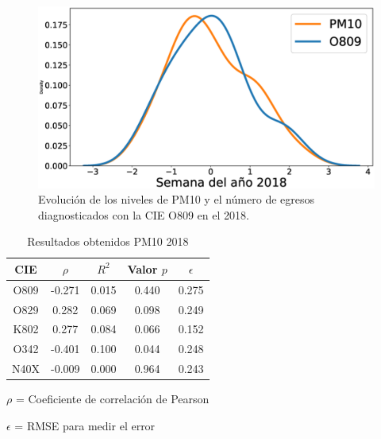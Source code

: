 \begin{figure}[h!]
\setcounter{figure}{2} %
\captionsetup{type=figure} %
\begin{center}
   \includegraphics[trim=61 0 0 0,clip,width=1\textwidth]{PM10_O809_2018.eps}
   \end{center}
    \caption[Series de tiempo 2018 PM10 y O809]{Evolución de los niveles de PM10 y el número de egresos diagnosticados con la CIE O809 en el 2018.}
    \label{serie_de_tiempo_2018_PM10}
\end{figure}

\begin{table}[hbt!]
\centering
\caption{Resultados obtenidos PM10 2018}
\label{tab:Resultados obtenidos PM10 2018}
\vspace{0.5cm}
\begin{threeparttable}
\begin{tabular}{|c|c|c|c|c|}
	\hline
	CIE & $\rho$ & $R^2$ & Valor $p$ & $\epsilon$\\
	\hline
	O809 & -0.271 & 0.015 & 0.440 & 0.275 \\
	\hline
	O829 & 0.282 & 0.069 & 0.098 & 0.249 \\
	\hline
	K802 & 0.277 & 0.084 & 0.066 & 0.152 \\
	\hline
	O342 & -0.401 & 0.100 & 0.044 & 0.248 \\
	\hline
	N40X & -0.009 & 0.000 & 0.964 & 0.243 \\
	\hline
\end{tabular}
\begin{tablenotes}
\footnotesize
\item{$\rho$ = Coeficiente de correlación de Pearson}
\item{$\epsilon$ = RMSE para medir el error}
\end{tablenotes}
\end{threeparttable}
\end{table}

